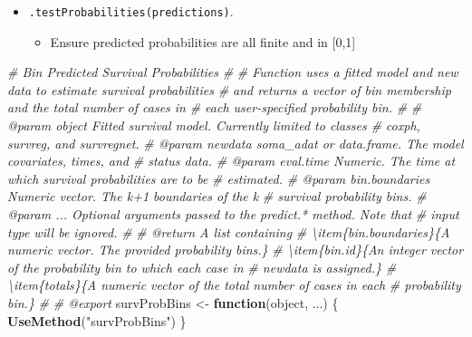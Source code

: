 \documentclass[
]{book}
\newenvironment{Shaded}{\begin{snugshade}}{\end{snugshade}}
\newcommand{\CommentTok}[1]{\textcolor[rgb]{0.56,0.35,0.01}{\textit{#1}}}
\newcommand{\ControlFlowTok}[1]{\textcolor[rgb]{0.13,0.29,0.53}{\textbf{#1}}}
\newcommand{\FunctionTok}[1]{\textcolor[rgb]{0.13,0.29,0.53}{\textbf{#1}}}
\newcommand{\NormalTok}[1]{#1}
\newcommand{\OtherTok}[1]{\textcolor[rgb]{0.56,0.35,0.01}{#1}}
\newcommand{\StringTok}[1]{\textcolor[rgb]{0.31,0.60,0.02}{#1}}
\providecommand{\tightlist}{%
  \setlength{\itemsep}{0pt}\setlength{\parskip}{0pt}}
\begin{document}
\begin{itemize}
  \begin{itemize}
  \tightlist
  \item
    \texttt{.testProbabilities(predictions)}.

    \begin{itemize}
    \tightlist
    \item
      Ensure predicted probabilities are all finite and in {[}0,1{]}
    \end{itemize}
  \end{itemize}
\end{itemize}

\begin{Shaded}
\begin{Highlighting}[]
\CommentTok{\#\textquotesingle{} Bin Predicted Survival Probabilities}
\CommentTok{\#\textquotesingle{} }
\CommentTok{\#\textquotesingle{} Function uses a fitted model and new data to estimate survival probabilities}
\CommentTok{\#\textquotesingle{}   and returns a vector of bin membership and the total number of cases in}
\CommentTok{\#\textquotesingle{}   each user{-}specified probability bin.}
\CommentTok{\#\textquotesingle{}   }
\CommentTok{\#\textquotesingle{} @param object Fitted survival model. Currently limited to classes}
\CommentTok{\#\textquotesingle{}   \textasciigrave{}coxph\textasciigrave{}, \textasciigrave{}survreg\textasciigrave{}, and \textasciigrave{}survregnet\textasciigrave{}.}
\CommentTok{\#\textquotesingle{} @param newdata soma\_adat or data.frame. The model covariates, times, and}
\CommentTok{\#\textquotesingle{}   status data.}
\CommentTok{\#\textquotesingle{} @param eval.time Numeric. The time at which survival probabilities are to be}
\CommentTok{\#\textquotesingle{}   estimated.}
\CommentTok{\#\textquotesingle{} @param bin.boundaries Numeric vector. The k+1 boundaries of the k}
\CommentTok{\#\textquotesingle{}   survival probability bins.}
\CommentTok{\#\textquotesingle{} @param ... Optional arguments passed to the \textasciigrave{}predict.*\textasciigrave{} method. Note that}
\CommentTok{\#\textquotesingle{}   input \textasciigrave{}type\textasciigrave{} will be ignored.}
\CommentTok{\#\textquotesingle{} }
\CommentTok{\#\textquotesingle{} @return A list containing}
\CommentTok{\#\textquotesingle{} \textbackslash{}item\{bin.boundaries\}\{A numeric vector. The provided probability bins.\}}
\CommentTok{\#\textquotesingle{} \textbackslash{}item\{bin.id\}\{An integer vector of the probability bin to which each case in }
\CommentTok{\#\textquotesingle{}   \textasciigrave{}newdata\textasciigrave{} is assigned.\}}
\CommentTok{\#\textquotesingle{} \textbackslash{}item\{totals\}\{A numeric vector of the total number of cases in each }
\CommentTok{\#\textquotesingle{}   probability bin.\}}
\CommentTok{\#\textquotesingle{} }
\CommentTok{\#\textquotesingle{} @export}
\NormalTok{survProbBins }\OtherTok{\textless{}{-}} \ControlFlowTok{function}\NormalTok{(object, ...) \{ }\FunctionTok{UseMethod}\NormalTok{(}\StringTok{"survProbBins"}\NormalTok{) \}}


\end{Highlighting}
\end{Shaded}
\end{document}
